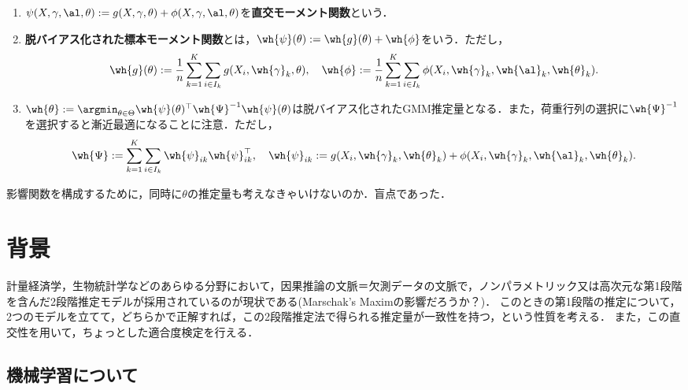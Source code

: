 \documentclass[uplatex,dvipdfmx]{jsreport}
\begin{document}
\begin{definition}\mbox{}
    \begin{enumerate}
        \item $\psi(X,\gamma,\al,\theta):=g(X,\gamma,\theta)+\phi(X,\gamma,\al,\theta)$を\textbf{直交モーメント関数}という．
        \item \textbf{脱バイアス化された標本モーメント関数}とは，$\wh{\psi}(\theta):=\wh{g}(\theta)+\wh{\phi}$をいう．ただし，
        \[\wh{g}(\theta):=\frac{1}{n}\sum_{k=1}^K\sum_{i\in I_k}g(X_i,\wh{\gamma}_k,\theta),\quad\wh{\phi}:=\frac{1}{n}\sum_{k=1}^K\sum_{i\in I_k}\phi(X_i,\wh{\gamma}_k,\wh{\al}_k,\wh{\theta}_k).\]
        \item $\wh{\theta}:=\argmin_{\theta\in\Theta}\wh{\psi}(\theta)^\top\wh{\Psi}^{-1}\wh{\psi}(\theta)$は脱バイアス化されたGMM推定量となる．また，荷重行列の選択に$\wh{\Psi}^{-1}$を選択すると漸近最適になることに注意．ただし，
        \[\wh{\Psi}:=\sum_{k=1}^K\sum_{i\in I_k}\wh{\psi}_{ik}\wh{\psi}_{ik}^\top,\quad \wh{\psi}_{ik}:=g(X_i,\wh{\gamma}_k,\wh{\theta}_k)+\phi(X_i,\wh{\gamma}_k,\wh{\al}_k,\wh{\theta}_k).\]
    \end{enumerate}
\end{definition}
\begin{remark}
    影響関数を構成するために，同時に$\theta$の推定量も考えなきゃいけないのか．盲点であった．
\end{remark}

\section{背景}

\begin{tcolorbox}[colframe=ForestGreen, colback=ForestGreen!10!white,breakable,colbacktitle=ForestGreen!40!white,coltitle=black,fonttitle=\bfseries\sffamily,
title=]
    計量経済学，生物統計学などのあらゆる分野において，因果推論の文脈＝欠測データの文脈で，ノンパラメトリック又は高次元な第1段階を含んだ2段階推定モデルが採用されているのが現状である(Marschak's Maximの影響だろうか？)．
    このときの第1段階の推定について，2つのモデルを立てて，どちらかで正解すれば，この2段階推定法で得られる推定量が一致性を持つ，という性質を考える．
    また，この直交性を用いて，ちょっとした適合度検定を行える．
\end{tcolorbox}

\subsection{機械学習について}
\end{document}
